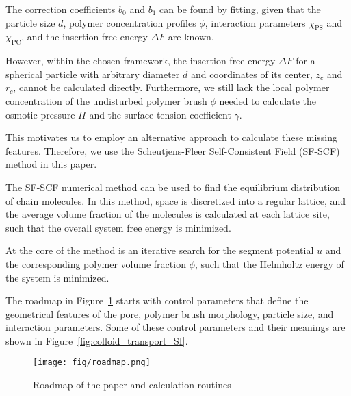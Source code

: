 \documentclass[10pt, a4paper]{article}
\begin{document}
\begin{multicols}{2}
The correction coefficients $b_0$ and $b_1$ can be found by fitting, given that the particle size $d$, polymer concentration profiles $\phi$, interaction parameters $\chi_{\textrm{PS}}$ and $\chi_{\textrm{PC}}$, and the insertion free energy $\Delta F$ are known.

However, within the chosen framework, the insertion free energy $\Delta F$ for a spherical particle with arbitrary diameter $d$ and coordinates of its center, $z_c$ and $r_c$, cannot be calculated directly.
Furthermore, we still lack the local polymer concentration of the undisturbed polymer brush $\phi$ needed to calculate the osmotic pressure $\Pi$ and the surface tension coefficient $\gamma$.


This motivates us to employ an alternative approach to calculate these missing features.
Therefore, we use the Scheutjens-Fleer Self-Consistent Field (SF-SCF) method in this paper.

The SF-SCF numerical method can be used to find the equilibrium distribution of chain molecules.
In this method, space is discretized into a regular lattice, and the average volume fraction of the molecules is calculated at each lattice site, such that the overall system free energy is minimized.

At the core of the method is an iterative search for the segment potential $u$ and the corresponding polymer volume fraction $\phi$, such that the Helmholtz energy of the system is minimized.

The roadmap in Figure~\ref{fig:paper_roadmap} starts with control parameters that define the geometrical features of the pore, polymer brush morphology, particle size, and interaction parameters.
Some of these control parameters and their meanings are shown in Figure~\ref{fig:colloid_transport_SI}.

\begin{figure}[H]
    \centering
    \texttt{[image: fig/roadmap.png]}
    \caption{Roadmap of the paper and calculation routines}
    \label{fig:paper_roadmap}
\end{figure}

\end{multicols}

\end{document}
